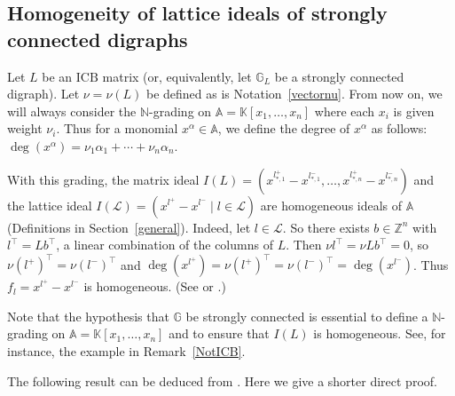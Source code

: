 \documentclass[ALCO]{cedram}
\newcommand{\mbn}{\mbox{$\mathbb{N}$}}
\newcommand{\mbz}{\mbox{$\mathbb{Z}$}}
\newcommand{\mbk}{\mbox{$\mathbb{K}$}}
\newcommand{\mba}{\mbox{$\mathbb{A}$}}
\newcommand{\mbg}{\mbox{$\mathbb{G}$}}
\newcommand{\mcl}{\mbox{$\mathcal{L}$}}
\newcommand{\icb}{\mbox{$\mathrm{ICB}$}}
\begin{document}
\subsection{Homogeneity of lattice ideals of strongly connected digraphs}
\label{hom-scd}\phantom{+}%

\begin{assumption}\label{grading}
Let $L$ be an $\icb$ matrix (or, equivalently, let $\mbg_L$ be a
strongly connected digraph). Let $\nu=\nu(L)$ be defined as is
Notation~\ref{vectornu}. From now on, we will always consider the
$\mbn$-grading on $\mba=\mbk[x_1,\ldots ,x_n]$ where each $x_i$ is
given weight $\nu_i$. Thus for a monomial $x^\alpha\in \mba$, we
define the degree of $x^\alpha$ as follows:
$\deg(x^\alpha)=\nu_1\alpha_1+\cdots+\nu_n\alpha_n$.
\end{assumption}

\begin{remark}\label{ILhomogeneous}
With this grading, the matrix ideal
$I(L)=(x^{l_{*,1}^+}-x^{l_{*,1}^-},\ldots
,x^{l_{*,n}^+}-x^{l_{*,n}^-})$ and the lattice ideal
$I(\mcl)=(x^{l^+}-x^{l^-}\mid l\in\mcl)$ are homogeneous ideals of
$\mba$ (\cf Definitions in Section~\ref{general}). Indeed, let
$l\in\mcl$. So there exists $b\in \mbz^n$ with $l^{\top}=Lb^{\top}$, a
linear combination of the columns of $L$.  Then $\nu l^{\top}=\nu
Lb^{\top}=0$, so $\nu (l^{+})^{\top}=\nu (l^{-})^{\top}$ and
$\deg(x^{l^{+}})=\nu (l^{+})^{\top}=\nu
(l^-)^{\top}=\deg(x^{l^-})$. Thus $f_l=x^{l^+}-x^{l^-}$ is
homogeneous. (See \cite[Definition~2.2]{op} or
\cite[Remark~5.6]{opv}.)
\end{remark}

Note that the hypothesis that $\mbg$ be strongly connected is
essential to define a $\mbn$-grading on $\mba=\mbk[x_1,\ldots ,x_n]$
and to ensure that $I(L)$ is homogeneous. See, for instance, the
example in Remark~\ref{NotICB}.

The following result can be deduced from
\cite[Proposition~7.6]{opv}. Here we give a shorter direct proof.
\end{document}
